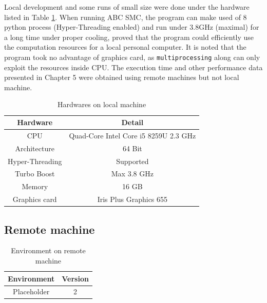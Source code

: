Local development and some runs of small size were done under the hardware listed in Table \ref{table:local_hardware}. When running ABC SMC, the program can make used of 8 python process (Hyper-Threading enabled) and run under 3.8GHz (maximal) for a long time under proper cooling, proved that the program could efficiently use the computation resources for a local personal computer. It is noted that the program took no advantage of graphics card, as \verb|multiprocessing| along can only exploit the resources inside CPU. The execution time and other performance data presented in Chapter 5 were obtained using remote machines but not local machine.

\begin{table}
    \centering
    \begin{tabular}{|c c|}
        \hline
        Hardware        & Detail                                \\ [0.5ex]
        \hline\hline
        CPU             & Quad-Core Intel Core i5 8259U 2.3 GHz \\
        Architecture    & 64 Bit                                \\
        Hyper-Threading & Supported                             \\
        Turbo Boost     & Max 3.8 GHz                           \\
        Memory          & 16 GB                                  \\
        Graphics card   & Iris Plus Graphics 655                \\
        \hline
    \end{tabular}
    \caption{Hardwares on local machine}
    \label{table:local_hardware}
\end{table}



\subsection{Remote machine}

\begin{table}[H]
    \centering
    \begin{tabular}{|c c|}
        \hline
        Environment                 & Version                       \\ [0.5ex]
        \hline\hline
        Placeholder                 & 2\\
        \hline
    \end{tabular}
    \caption{Environment on remote machine}
    \label{table:remote_macine}
\end{table}

